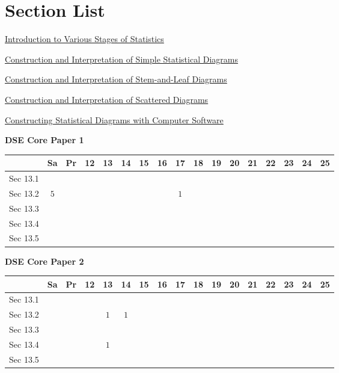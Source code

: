 \documentclass[12pt, a4paper]{article}
\begin{document}
\section*{Section List}
\begin{enumx}[label=Sec 13.\arabic*\ ]
\item \hyperref[section:1-13-1]{Introduction to Various Stages of Statistics}
\item \hyperref[section:1-13-2]{Construction and Interpretation of Simple Statistical Diagrams}
\item \hyperref[section:1-13-3]{Construction and Interpretation of Stem-and-Leaf Diagrams}
\item \hyperref[section:1-13-4]{Construction and Interpretation of Scattered Diagrams}
\item \hyperref[section:1-13-5]{Constructing Statistical Diagrams with Computer Software}
\end{enumx}
\begin{absolutelynopagebreak}
\begin{center}
\textbf{DSE Core Paper 1}
\end{center}
\begin{center}
\begin{tabular}{|l|c|c|c|c|c|c|c|c|c|c|c|c|c|c|c|c|}
\hline
        & Sa & Pr & 12 & 13 & 14 & 15 & 16 & 17 & 18 & 19 & 20 & 21 & 22 & 23 & 24 & 25 \\\hline\hline
Sec 13.1 &  &  &  &  &  &  &  &  &  &  &  &  &  &  &  &  \\\hline
Sec 13.2 &  $5$ &  &  &  &  &  &  &  $1$ &  &  &  &  &  &  &  &  \\\hline
Sec 13.3 &  &  &  &  &  &  &  &  &  &  &  &  &  &  &  &  \\\hline
Sec 13.4 &  &  &  &  &  &  &  &  &  &  &  &  &  &  &  &  \\\hline
Sec 13.5 &  &  &  &  &  &  &  &  &  &  &  &  &  &  &  &  \\\hline
\end{tabular}
\end{center}
\end{absolutelynopagebreak}
\begin{absolutelynopagebreak}
\begin{center}
\textbf{DSE Core Paper 2}
\end{center}
\begin{center}
\begin{tabular}{|l|c|c|c|c|c|c|c|c|c|c|c|c|c|c|c|c|}
\hline
        & Sa & Pr & 12 & 13 & 14 & 15 & 16 & 17 & 18 & 19 & 20 & 21 & 22 & 23 & 24 & 25 \\\hline\hline
Sec 13.1 &  &  &  &  &  &  &  &  &  &  &  &  &  &  &  &  \\\hline
Sec 13.2 &  &  &  &  $1$ &  $1$ &  &  &  &  &  &  &  &  &  &  &  \\\hline
Sec 13.3 &  &  &  &  &  &  &  &  &  &  &  &  &  &  &  &  \\\hline
Sec 13.4 &  &  &  &  $1$ &  &  &  &  &  &  &  &  &  &  &  &  \\\hline
Sec 13.5 &  &  &  &  &  &  &  &  &  &  &  &  &  &  &  &  \\\hline
\end{tabular}
\end{center}
\end{absolutelynopagebreak}
\end{document}

